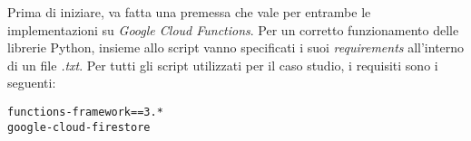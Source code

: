 Prima di iniziare, va fatta una premessa che vale per entrambe le implementazioni su \textit{Google Cloud Functions}. Per un corretto funzionamento delle librerie Python, insieme allo script vanno specificati i suoi \textit{requirements} all'interno di un file \textit{.txt}. Per tutti gli script utilizzati per il caso studio, i requisiti sono i seguenti:
\begin{lstlisting}
functions-framework==3.*
google-cloud-firestore
\end{lstlisting}